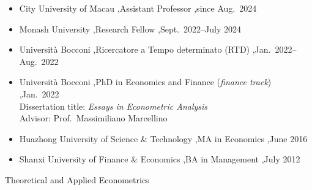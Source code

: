 \documentclass[letterpaper,10pt]{article}
\begin{document}


\begin{itemize}
  \item City University of Macau \sep Assistant Professor \sep since Aug.\ 2024
  \item Monash University \sep Research Fellow \sep Sept.\ 2022--July 2024
  \item Universit\`a Bocconi \sep Ricercatore a Tempo determinato (RTD) \sep Jan.\ 2022--Aug.\ 2022
\end{itemize}


\begin{itemize}
  \item Universit\`a Bocconi \sep PhD in Economics and Finance (\emph{finance track}) \sep Jan.\ 2022\\
        Dissertation title: \textit{Essays in Econometric Analysis}\\
        Advisor: Prof.\ Massimiliano Marcellino
  \item Huazhong University of Science \& Technology \sep MA in Economics \sep June 2016
  \item Shanxi University of Finance \& Economics \sep BA in Management \sep July 2012
\end{itemize}

Theoretical and Applied Econometrics

\end{document}
